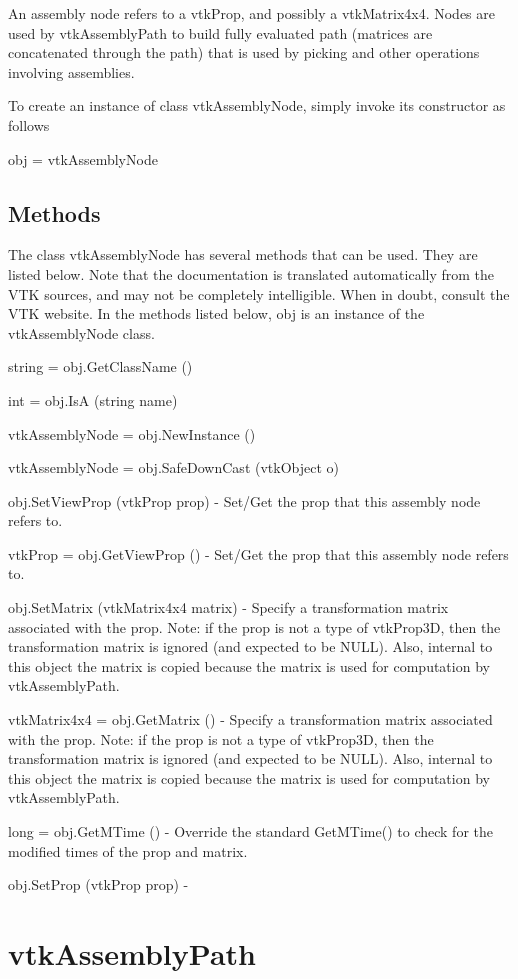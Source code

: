 An assembly node refers to a vtk\-Prop, and possibly a vtk\-Matrix4x4. Nodes are used by vtk\-Assembly\-Path to build fully evaluated path (matrices are concatenated through the path) that is used by picking and other operations involving assemblies.

To create an instance of class vtk\-Assembly\-Node, simply invoke its constructor as follows \begin{DoxyVerb}  obj = vtkAssemblyNode
\end{DoxyVerb}
 \hypertarget{vtkwidgets_vtkxyplotwidget_Methods}{}\subsection{Methods}\label{vtkwidgets_vtkxyplotwidget_Methods}
The class vtk\-Assembly\-Node has several methods that can be used. They are listed below. Note that the documentation is translated automatically from the V\-T\-K sources, and may not be completely intelligible. When in doubt, consult the V\-T\-K website. In the methods listed below, {\ttfamily obj} is an instance of the vtk\-Assembly\-Node class. 
\begin{DoxyItemize}
\item {\ttfamily string = obj.\-Get\-Class\-Name ()}  
\item {\ttfamily int = obj.\-Is\-A (string name)}  
\item {\ttfamily vtk\-Assembly\-Node = obj.\-New\-Instance ()}  
\item {\ttfamily vtk\-Assembly\-Node = obj.\-Safe\-Down\-Cast (vtk\-Object o)}  
\item {\ttfamily obj.\-Set\-View\-Prop (vtk\-Prop prop)} -\/ Set/\-Get the prop that this assembly node refers to.  
\item {\ttfamily vtk\-Prop = obj.\-Get\-View\-Prop ()} -\/ Set/\-Get the prop that this assembly node refers to.  
\item {\ttfamily obj.\-Set\-Matrix (vtk\-Matrix4x4 matrix)} -\/ Specify a transformation matrix associated with the prop. Note\-: if the prop is not a type of vtk\-Prop3\-D, then the transformation matrix is ignored (and expected to be N\-U\-L\-L). Also, internal to this object the matrix is copied because the matrix is used for computation by vtk\-Assembly\-Path.  
\item {\ttfamily vtk\-Matrix4x4 = obj.\-Get\-Matrix ()} -\/ Specify a transformation matrix associated with the prop. Note\-: if the prop is not a type of vtk\-Prop3\-D, then the transformation matrix is ignored (and expected to be N\-U\-L\-L). Also, internal to this object the matrix is copied because the matrix is used for computation by vtk\-Assembly\-Path.  
\item {\ttfamily long = obj.\-Get\-M\-Time ()} -\/ Override the standard Get\-M\-Time() to check for the modified times of the prop and matrix.  
\item {\ttfamily obj.\-Set\-Prop (vtk\-Prop prop)} -\/  
\end{DoxyItemize}\hypertarget{vtkcommon_vtkassemblypath}{}\section{vtk\-Assembly\-Path}\label{vtkcommon_vtkassemblypath}
